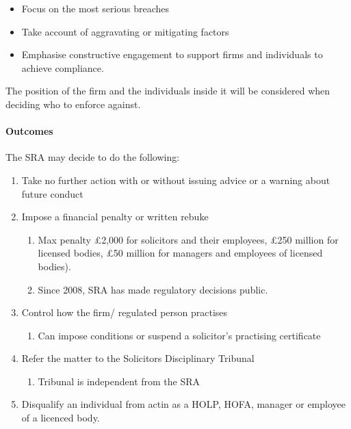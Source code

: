 \documentclass[
]{article}
\providecommand{\tightlist}{%
  \setlength{\itemsep}{0pt}\setlength{\parskip}{0pt}}
\begin{document}
\begin{itemize}
\tightlist
\item
  Focus on the most serious breaches
\item
  Take account of aggravating or mitigating factors
\item
  Emphasise constructive engagement to support firms and individuals to
  achieve compliance.
\end{itemize}

The position of the firm and the individuals inside it will be
considered when deciding who to enforce against.

\hypertarget{outcomes}{%
\paragraph{Outcomes}\label{outcomes}}

The SRA may decide to do the following:

\begin{enumerate}
\tightlist
\item
  Take no further action with or without issuing advice or a warning
  about future conduct
\item
  Impose a financial penalty or written rebuke

  \begin{enumerate}
  \tightlist
  \item
    Max penalty £2,000 for solicitors and their employees, £250 million
    for licensed bodies, £50 million for managers and employees of
    licensed bodies).
  \item
    Since 2008, SRA has made regulatory decisions public.
  \end{enumerate}
\item
  Control how the firm/ regulated person practises

  \begin{enumerate}
  \tightlist
  \item
    Can impose conditions or suspend a solicitor's practising
    certificate
  \end{enumerate}
\item
  Refer the matter to the Solicitors Disciplinary Tribunal

  \begin{enumerate}
  \tightlist
  \item
    Tribunal is independent from the SRA
  \end{enumerate}
\item
  Disqualify an individual from actin as a HOLP, HOFA, manager or
  employee of a licenced body.
\end{enumerate}
\end{document}
